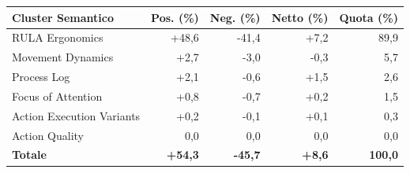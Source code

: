 \begin{tabular*}{\linewidth}{@{}l@{\extracolsep{\fill}}rrrr@{}}
\toprule
\textbf{Cluster Semantico} & \textbf{Pos. (\%)} & \textbf{Neg. (\%)} & \textbf{Netto (\%)} & \textbf{Quota (\%)} \\
\midrule
RULA Ergonomics & +48{,}6 & -41{,}4 & +7{,}2 & 89{,}9 \\
Movement Dynamics & +2{,}7 & -3{,}0 & -0{,}3 & 5{,}7 \\
Process Log & +2{,}1 & -0{,}6 & +1{,}5 & 2{,}6 \\
Focus of Attention & +0{,}8 & -0{,}7 & +0{,}2 & 1{,}5 \\
Action Execution Variants & +0{,}2 & -0{,}1 & +0{,}1 & 0{,}3 \\
Action Quality & 0{,}0 & 0{,}0 & 0{,}0 & 0{,}0 \\
\midrule
\textbf{Totale} & \textbf{+54{,}3} & \textbf{-45{,}7} & \textbf{+8{,}6} & \textbf{100{,}0} \\
\bottomrule
\end{tabular*}
